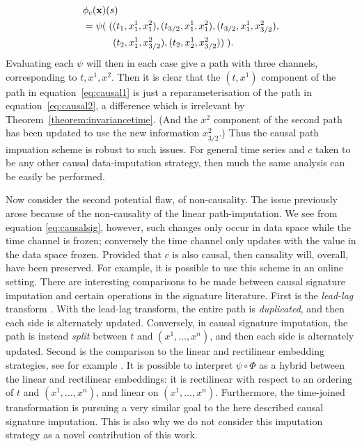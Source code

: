 \documentclass{article}
\begin{document}
%
\begin{align}
    &\phi_c(\mathbf{x})(s)\nonumber\\
    &=\psi(\;((t_1, x_1^1, x_1^2), (t_{3/2}, x_1^1, x_1^2), (t_{3/2}, x_1^1, x_{3/2}^2),\nonumber\\ &\hspace{3.1em}(t_2, x_1^1, x_{3/2}^2), (t_2, x_2^1, x_{3/2}^2))\;).\label{eq:causal2}
\end{align}
%
Evaluating each $\psi$ will then in each case give a path with three
channels, corresponding to $t, x^1, x^2$. Then it is clear that the $(t,
x^1)$ component of the path in equation~\eqref{eq:causal1} is just
a reparameterisation of the path in equation~\eqref{eq:causal2},
a difference which is irrelevant by Theorem~\ref{theorem:invariancetime}.
(And the $x^2$ component of the second
path has been updated to use the new information $x_{3/2}^2$.) Thus the causal path impuation scheme is robust to such issues. For general time series and
$c$ taken to be any other causal data-imputation strategy, then much the
same analysis can be easily be performed.

Now consider the second potential flaw, of non-causality. The issue
previously arose because of the non-causality of the linear
path-imputation. We see from equation \eqref{eq:causalsig}, however,
such changes only occur in data space while the time channel is frozen;
conversely the time channel only updates with the value in the data
space frozen. Provided that $c$ is also causal, then causality will,
overall, have been preserved. For example, it is possible to use this
scheme in an online setting.
%
There are interesting comparisons to be made between causal signature
imputation and certain operations in the signature literature. First is
the \emph{lead-lag} transform \cite{primer2016}. With the lead-lag
transform, the entire path is \emph{duplicated}, and then each side is
alternately updated. Conversely, in causal signature imputation, the
path is instead \emph{split} between $t$ and $(x^1, \ldots, x^n)$, and
then each side is alternately updated.
%
Second is the comparison to the linear and rectilinear embedding
strategies, see for example \cite{fermanian2019embedding}. It is
possible to interpret $\psi \circ \Phi$ as a hybrid between the linear
and rectilinear embeddings: it is rectilinear with respect to an
ordering of $t$ and $(x^1, \ldots, x^n)$, and linear on $(x^1, \ldots,
x^n)$.
Furthermore, the time-joined transformation \cite{levin2013} is pursuing a very similar goal to the here described causal signature imputation. This is also why we do not consider this imputation strategy as a novel contribution of this work.
\end{document}
